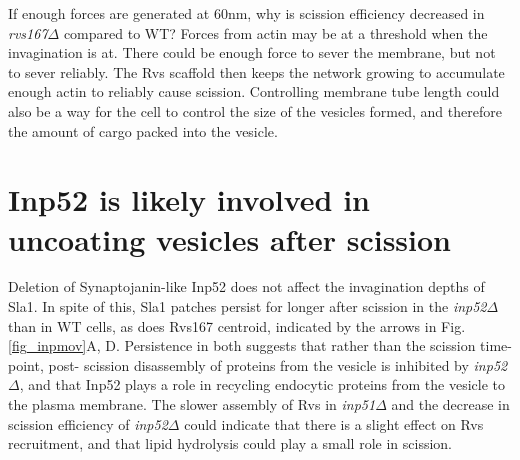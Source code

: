 	\vspace{5mm}
If enough forces are generated at 60nm, why is scission efficiency decreased in \textit{rvs167$\Delta$} compared to WT? 
Forces from actin may be at a threshold when the invagination is at. There could be enough force to sever the membrane, but not to sever reliably. The Rvs scaffold then keeps the network growing to accumulate enough actin to reliably cause scission. Controlling membrane tube length could also be a way for the cell to control the size of the vesicles formed, and therefore the amount of cargo packed into the vesicle. 





\section{Inp52 is likely involved in uncoating vesicles after scission}
Deletion of Synaptojanin-like Inp52 does not affect the invagination depths of Sla1. In spite of this, Sla1 patches persist for longer after scission in the \textit{inp52$\Delta$} than in WT cells, as does Rvs167 centroid, indicated by the arrows in Fig.\ref{fig_inpmov}A, D. Persistence in both suggests that rather than the scission time-point, post- scission disassembly of proteins from the vesicle is inhibited by \textit{inp52$\Delta$}, and that Inp52 plays a role in recycling endocytic proteins from the vesicle to the plasma membrane. The slower assembly of Rvs in \textit{inp51$\Delta$}  and the decrease in scission efficiency of \textit{inp52$\Delta$} could indicate that there is a slight effect on Rvs recruitment, and that lipid hydrolysis could play a small role in scission. 


\newpage
